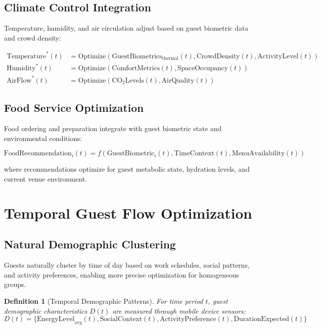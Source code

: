\documentclass[12pt,a4paper]{article}
\newtheorem{definition}{Definition}
\begin{document}
\subsection{Climate Control Integration}

Temperature, humidity, and air circulation adjust based on guest biometric data and crowd density:

\begin{align}
\text{Temperature}^*(t) &= \text{Optimize}(\text{GuestBiometrics}_{\text{thermal}}(t), \text{CrowdDensity}(t), \text{ActivityLevel}(t)) \\
\text{Humidity}^*(t) &= \text{Optimize}(\text{ComfortMetrics}(t), \text{SpaceOccupancy}(t)) \\
\text{AirFlow}^*(t) &= \text{Optimize}(\text{CO}_2\text{Levels}(t), \text{AirQuality}(t))
\end{align}

\subsection{Food Service Optimization}

Food ordering and preparation integrate with guest biometric state and environmental conditions:

\begin{equation}
\text{FoodRecommendation}_i(t) = f(\text{GuestBiometric}_i(t), \text{TimeContext}(t), \text{MenuAvailability}(t))
\end{equation}

where recommendations optimize for guest metabolic state, hydration levels, and current venue environment.

\section{Temporal Guest Flow Optimization}

\subsection{Natural Demographic Clustering}

Guests naturally cluster by time of day based on work schedules, social patterns, and activity preferences, enabling more precise optimization for homogeneous groups.

\begin{definition}[Temporal Demographic Patterns]
For time period $t$, guest demographic characteristics $D(t)$ are measured through mobile device sensors:
\begin{equation}
D(t) = \{\text{EnergyLevel}_{\text{avg}}(t), \text{SocialContext}(t), \text{ActivityPreference}(t), \text{DurationExpected}(t)\}
\end{equation}
\end{definition}
\end{document}
